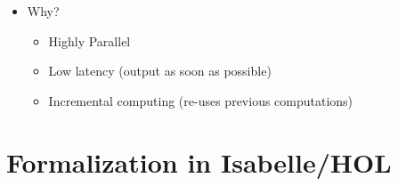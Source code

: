 \documentclass[aspectratio=169,10pt]{beamer}
\begin{document}
\begin{frame}[fragile]
\begin{itemize}
\begin{overlayarea}{\textwidth}{.1\textheight}
\begin{figure}
              \centering
            \end{figure}
          \end{overlayarea}
          \vspace*{-1ex}
          \pause
    \item Why?
          \begin{itemize}
            \item Highly Parallel
            \item Low latency (output as soon as possible)
            \item Incremental computing (re-uses previous computations)
          \end{itemize}
  \end{itemize}
\end{frame}


\section{Formalization in Isabelle/HOL}
\end{document}
